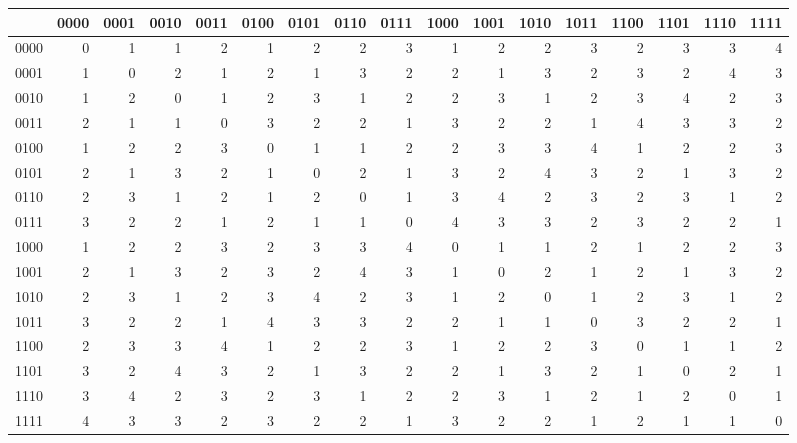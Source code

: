 \begin{tabular}{lrrrrrrrrrrrrrrrr}
\toprule
 & 0000 & 0001 & 0010 & 0011 & 0100 & 0101 & 0110 & 0111 & 1000 & 1001 & 1010 & 1011 & 1100 & 1101 & 1110 & 1111 \\
\midrule
0000 & 0 & 1 & 1 & 2 & 1 & 2 & 2 & 3 & 1 & 2 & 2 & 3 & 2 & 3 & 3 & 4 \\
0001 & 1 & 0 & 2 & 1 & 2 & 1 & 3 & 2 & 2 & 1 & 3 & 2 & 3 & 2 & 4 & 3 \\
0010 & 1 & 2 & 0 & 1 & 2 & 3 & 1 & 2 & 2 & 3 & 1 & 2 & 3 & 4 & 2 & 3 \\
0011 & 2 & 1 & 1 & 0 & 3 & 2 & 2 & 1 & 3 & 2 & 2 & 1 & 4 & 3 & 3 & 2 \\
0100 & 1 & 2 & 2 & 3 & 0 & 1 & 1 & 2 & 2 & 3 & 3 & 4 & 1 & 2 & 2 & 3 \\
0101 & 2 & 1 & 3 & 2 & 1 & 0 & 2 & 1 & 3 & 2 & 4 & 3 & 2 & 1 & 3 & 2 \\
0110 & 2 & 3 & 1 & 2 & 1 & 2 & 0 & 1 & 3 & 4 & 2 & 3 & 2 & 3 & 1 & 2 \\
0111 & 3 & 2 & 2 & 1 & 2 & 1 & 1 & 0 & 4 & 3 & 3 & 2 & 3 & 2 & 2 & 1 \\
1000 & 1 & 2 & 2 & 3 & 2 & 3 & 3 & 4 & 0 & 1 & 1 & 2 & 1 & 2 & 2 & 3 \\
1001 & 2 & 1 & 3 & 2 & 3 & 2 & 4 & 3 & 1 & 0 & 2 & 1 & 2 & 1 & 3 & 2 \\
1010 & 2 & 3 & 1 & 2 & 3 & 4 & 2 & 3 & 1 & 2 & 0 & 1 & 2 & 3 & 1 & 2 \\
1011 & 3 & 2 & 2 & 1 & 4 & 3 & 3 & 2 & 2 & 1 & 1 & 0 & 3 & 2 & 2 & 1 \\
1100 & 2 & 3 & 3 & 4 & 1 & 2 & 2 & 3 & 1 & 2 & 2 & 3 & 0 & 1 & 1 & 2 \\
1101 & 3 & 2 & 4 & 3 & 2 & 1 & 3 & 2 & 2 & 1 & 3 & 2 & 1 & 0 & 2 & 1 \\
1110 & 3 & 4 & 2 & 3 & 2 & 3 & 1 & 2 & 2 & 3 & 1 & 2 & 1 & 2 & 0 & 1 \\
1111 & 4 & 3 & 3 & 2 & 3 & 2 & 2 & 1 & 3 & 2 & 2 & 1 & 2 & 1 & 1 & 0 \\
\bottomrule
\end{tabular}
